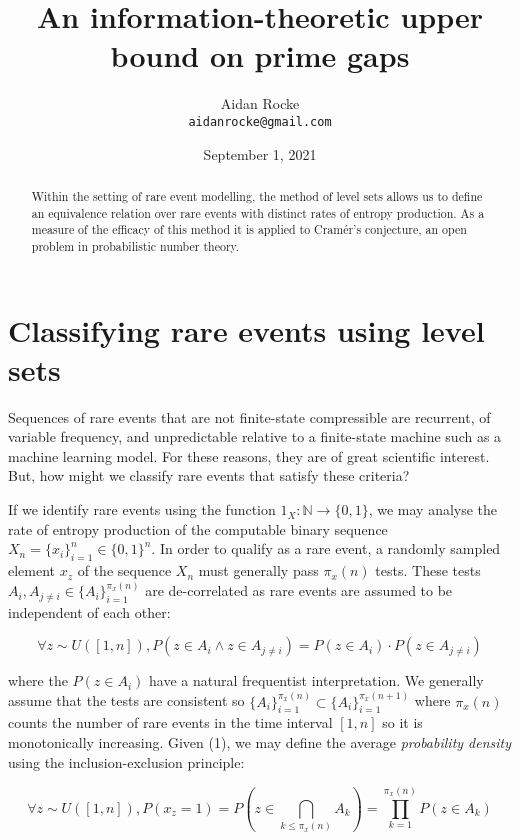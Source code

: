 \documentclass{article}
\title{An information-theoretic upper bound on prime gaps}
\date{September 1, 2021}
\author{%
  Aidan Rocke\\
  \texttt{aidanrocke@gmail.com} \\
}
\begin{document}
\maketitle

\begin{abstract}
Within the setting of rare event modelling, the method of level sets allows 
us to define an equivalence relation over rare events with distinct rates of entropy production. As a measure of the efficacy of this method it is applied to Cramér's conjecture, an open problem in probabilistic number theory. 
\end{abstract}

\section{Classifying rare events using level sets}
 
Sequences of rare events that are not finite-state compressible are recurrent, of variable frequency, and unpredictable relative to a finite-state machine such as a machine learning model. For these reasons, they are of great scientific interest. But, how might we classify rare events that satisfy these criteria? 

If we identify rare events using the function $1_X: \mathbb{N} \rightarrow \{0,1\}$, we may analyse the rate of
entropy production of the computable binary sequence $X_n = \{x_i\}_{i=1}^n \in \{0,1\}^n$. In order to qualify as a rare event, a randomly sampled element $x_z$ of the sequence $X_n$ must generally
pass $\pi_x(n)$ tests. These tests $A_i, A_{j \neq i} \in \{A_i\}_{i=1}^{\pi_x(n)}$ are de-correlated as rare events are assumed to be independent of each other: 

\begin{equation}
\forall z \sim U([1,n]), P(z \in A_i \land z \in A_{j \neq i}) = P(z \in A_i ) \cdot P(z \in A_{j \neq i})
\end{equation}

where the $P(z \in A_i )$ have a natural frequentist interpretation. We generally assume that the tests are consistent so $\{A_i\}_{i=1}^{\pi_x(n)} \subset \{A_i\}_{i=1}^{\pi_x(n+1)}$ where $\pi_{x}(n)$ counts the number of rare events in the time interval $[1,n]$ so it is monotonically increasing. Given (1), we may define the average \textit{probability density} using the inclusion-exclusion principle:

\begin{equation}
\forall z \sim U([1,n]), P(x_z =1) = P(z \in \bigcap_{k \leq \pi_x(n)} A_k) = \prod_{k=1}^{\pi_x(n)} P(z \in A_k)
\end{equation}
\end{document}
